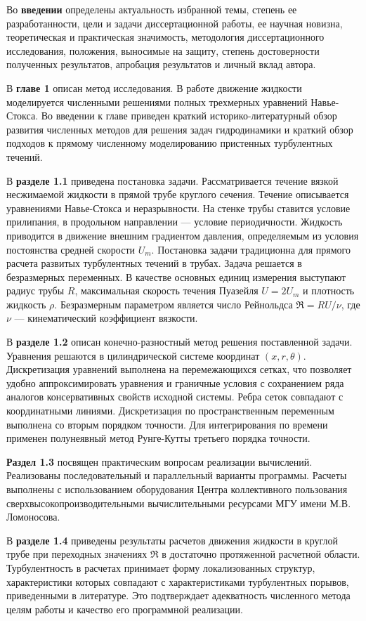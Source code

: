 Во \textbf{введении} определены актуальность избранной темы, степень ее разработанности, цели и задачи диссертационной работы, ее научная новизна, теоретическая и практическая значимость, методология диссертационного исследования, положения, выносимые на защиту, степень достоверности полученных результатов, апробация результатов и личный вклад автора. 

В {\bf главе 1} описан метод исследования. В работе движение жидкости моделируется численными решениями полных трехмерных уравнений Навье-Стокса. 
Во введении к главе приведен краткий историко-литературный обзор развития численных методов для решения задач гидродинамики и краткий обзор подходов к прямому численному моделированию пристенных турбулентных течений. 

В \textbf{разделе 1.1} приведена постановка задачи. Рассматривается течение вязкой несжимаемой жидкости в прямой трубе круглого сечения. Течение описывается уравнениями Навье-Стокса и неразрывности. На стенке трубы ставится условие прилипания, в продольном направлении --- условие периодичности. Жидкость приводится в движение внешним градиентом давления, определяемым из условия постоянства средней скорости $U_m$. Постановка задачи традиционна для прямого расчета развитых турбулентных течений в трубах. Задача решается в безразмерных переменных. В качестве основных единиц измерения выступают радиус трубы $R$, максимальная скорость течения Пуазейля $U = 2U_m$ и плотность жидкость $\rho$. Безразмерным параметром является число Рейнольдса $\Re = RU/\nu$, где $\nu$ --- кинематический коэффициент вязкости.

В \textbf{разделе 1.2} описан конечно-разностный метод решения поставленной задачи. Уравнения решаются в цилиндрической системе координат $(x,r,\theta)$. Дискретизация уравнений выполнена на перемежающихся сетках, что позволяет удобно аппроксимировать уравнения и граничные условия с сохранением ряда аналогов консервативных свойств исходной системы. Ребра сеток совпадают с координатными линиями. Дискретизация по пространственным переменным выполнена со вторым порядком точности. Для интегрирования по времени применен полунеявный метод Рунге-Кутты третьего порядка точности. %

\textbf{Раздел 1.3} посвящен практическим вопросам реализации вычислений. Реализованы последовательный и параллельный варианты программы. Расчеты выполнены с использованием оборудования Центра коллективного пользования сверхвысокопроизводительными вычислительными ресурсами МГУ имени М.В.\,Ломоносова. 

В \textbf{разделе 1.4} приведены результаты расчетов движения жидкости в круглой трубе при переходных значениях $\Re$ в достаточно протяженной расчетной области. Турбулентность в расчетах принимает форму локализованных структур, характеристики которых совпадают с характеристиками турбулентных порывов, приведенными в литературе. Это подтверждает адекватность численного метода целям работы и качество его программной реализации. 


